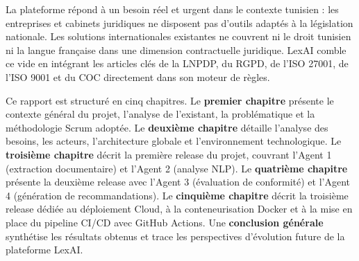 \documentclass[12pt,a4paper,twoside]{report}
\begin{document}
\vspace{1em}

La plateforme répond à un besoin réel et urgent dans le contexte tunisien : les entreprises et cabinets juridiques ne disposent pas d'outils adaptés à la législation nationale. Les solutions internationales existantes ne couvrent ni le droit tunisien ni la langue française dans une dimension contractuelle juridique. LexAI comble ce vide en intégrant les articles clés de la LNPDP, du RGPD, de l'ISO 27001, de l'ISO 9001 et du COC directement dans son moteur de règles.

\vspace{1em}

Ce rapport est structuré en cinq chapitres. Le \textbf{premier chapitre} présente le contexte général du projet, l'analyse de l'existant, la problématique et la méthodologie Scrum adoptée. Le \textbf{deuxième chapitre} détaille l'analyse des besoins, les acteurs, l'architecture globale et l'environnement technologique. Le \textbf{troisième chapitre} décrit la première release du projet, couvrant l'Agent 1 (extraction documentaire) et l'Agent 2 (analyse NLP). Le \textbf{quatrième chapitre} présente la deuxième release avec l'Agent 3 (évaluation de conformité) et l'Agent 4 (génération de recommandations). Le \textbf{cinquième chapitre} décrit la troisième release dédiée au déploiement Cloud, à la conteneurisation Docker et à la mise en place du pipeline CI/CD avec GitHub Actions. Une \textbf{conclusion générale} synthétise les résultats obtenus et trace les perspectives d'évolution future de la plateforme LexAI.












\nocite{*}



\end{document}
